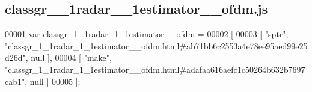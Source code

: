 \subsection{classgr\+\_\+\_\+1radar\+\_\+\_\+1estimator\+\_\+\+\_\+ofdm.\+js}
\label{classgr__1__1radar__1__1estimator____ofdm_8js_source}

\begin{DoxyCode}
00001 var classgr_1_1radar_1_1estimator__ofdm =
00002 [
00003     [ \textcolor{stringliteral}{"sptr"}, \textcolor{stringliteral}{"classgr\_1\_1radar\_1\_1estimator\_\_ofdm.html#ab71bb6c2553a4e78ee95aed99e25d26d"}, null ],
00004     [ \textcolor{stringliteral}{"make"}, \textcolor{stringliteral}{"classgr\_1\_1radar\_1\_1estimator\_\_ofdm.html#adafaa616aefc1c50264b632b7697cab1"}, null ]
00005 ];
\end{DoxyCode}
